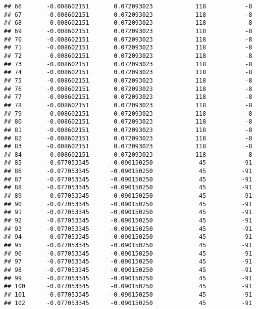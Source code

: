 \documentclass[]{article}
\begin{document}
\begin{verbatim}
## 66       -0.008602151       0.072093023            118           -8
## 67       -0.008602151       0.072093023            118           -8
## 68       -0.008602151       0.072093023            118           -8
## 69       -0.008602151       0.072093023            118           -8
## 70       -0.008602151       0.072093023            118           -8
## 71       -0.008602151       0.072093023            118           -8
## 72       -0.008602151       0.072093023            118           -8
## 73       -0.008602151       0.072093023            118           -8
## 74       -0.008602151       0.072093023            118           -8
## 75       -0.008602151       0.072093023            118           -8
## 76       -0.008602151       0.072093023            118           -8
## 77       -0.008602151       0.072093023            118           -8
## 78       -0.008602151       0.072093023            118           -8
## 79       -0.008602151       0.072093023            118           -8
## 80       -0.008602151       0.072093023            118           -8
## 81       -0.008602151       0.072093023            118           -8
## 82       -0.008602151       0.072093023            118           -8
## 83       -0.008602151       0.072093023            118           -8
## 84       -0.008602151       0.072093023            118           -8
## 85       -0.077053345      -0.090150250             45          -91
## 86       -0.077053345      -0.090150250             45          -91
## 87       -0.077053345      -0.090150250             45          -91
## 88       -0.077053345      -0.090150250             45          -91
## 89       -0.077053345      -0.090150250             45          -91
## 90       -0.077053345      -0.090150250             45          -91
## 91       -0.077053345      -0.090150250             45          -91
## 92       -0.077053345      -0.090150250             45          -91
## 93       -0.077053345      -0.090150250             45          -91
## 94       -0.077053345      -0.090150250             45          -91
## 95       -0.077053345      -0.090150250             45          -91
## 96       -0.077053345      -0.090150250             45          -91
## 97       -0.077053345      -0.090150250             45          -91
## 98       -0.077053345      -0.090150250             45          -91
## 99       -0.077053345      -0.090150250             45          -91
## 100      -0.077053345      -0.090150250             45          -91
## 101      -0.077053345      -0.090150250             45          -91
## 102      -0.077053345      -0.090150250             45          -91

\end{verbatim}
\end{document}
